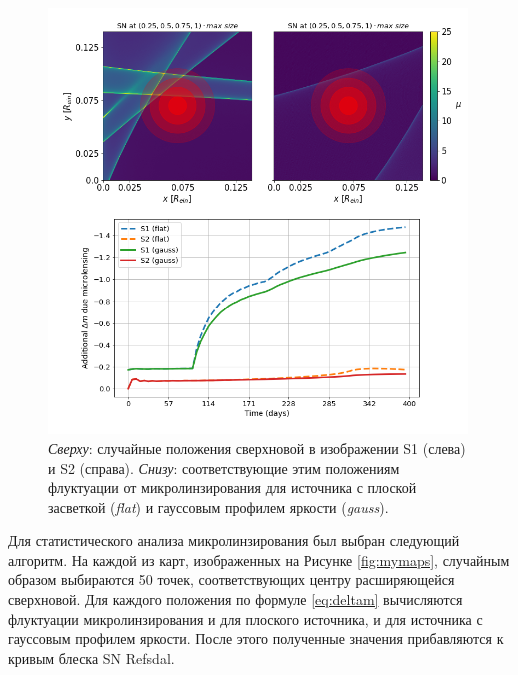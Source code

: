 \begin{figure}[H]
    \centering
	\includegraphics[width=0.99\textwidth]{microlensing/images/caustic.png}
	\caption{\textit{Сверху}: случайные положения сверхновой в изображении S1 (слева) и S2 (справа). \textit{Снизу}: соответствующие этим положениям флуктуации от микролинзирования для источника с плоской засветкой (\textit{flat}) и гауссовым профилем яркости (\textit{gauss}).} 
	\label{fig:example}
\end{figure}

Для статистического анализа микролинзирования был выбран следующий алгоритм. На каждой из карт, изображенных на Рисунке \ref{fig:mymaps}, случайным образом выбираются 50 точек, соответствующих центру расширяющейся сверхновой. Для каждого положения по формуле \eqref{eq:deltam} вычисляются флуктуации микролинзирования и для плоского источника, и для источника с гауссовым профилем яркости. После этого полученные значения прибавляются к кривым блеска SN Refsdal.




